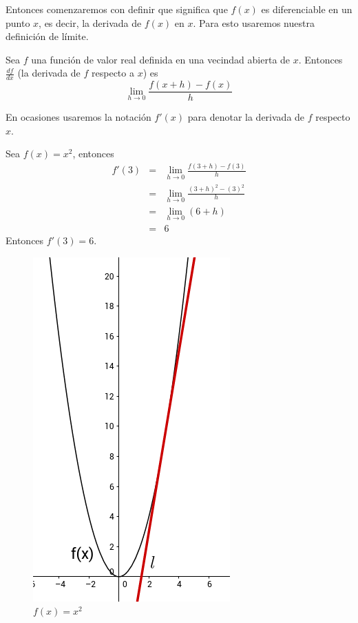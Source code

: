 Entonces comenzaremos con definir que significa que $f(x)$ es diferenciable en un punto $x$, es decir, la derivada de $f(x)$ en $x$. Para esto usaremos
nuestra definición de límite.

\begin{definition}
    Sea $f$ una función de valor real definida en una vecindad abierta de $x$. Entonces $\frac{df}{dx}$ (la derivada de $f$ respecto a $x$) es
    $$ \lim_{h \rightarrow 0} \frac{f(x+h) - f(x)}{h} $$
\end{definition}

En ocasiones usaremos la notación $f'(x)$ para denotar la derivada de $f$ respecto $x$.

\begin{example}
    Sea $f(x)=x^{2}$, entonces
    \begin{eqnarray*}
        f'(3) &=& \lim_{h \rightarrow 0} \frac{f(3+h)-f(3)}{h} \\
              &=& \lim_{h \rightarrow 0} \frac{(3+h)^{2}-(3)^{2}}{h} \\
              &=& \lim_{h \rightarrow 0} (6 + h) \\
              &=& 6
    \end{eqnarray*}
    Entonces $f'(3) = 6$.
\end{example}

\begin{figure}[!ht]
  \begin{center}
      \includegraphics[width=0.5\linewidth]{gfx/derivative-example}
      \caption{$f(x)=x^{2}$}
      \label{fig:boat1}
  \end{center}
\end{figure}

